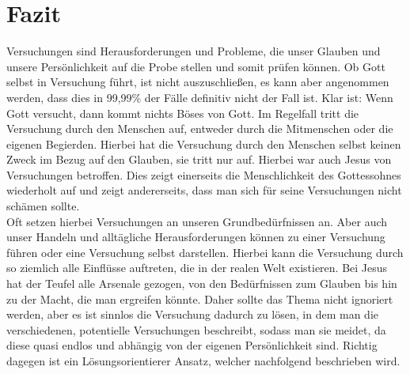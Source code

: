 \section{Fazit}
Versuchungen sind Herausforderungen und Probleme, die unser Glauben und unsere Persönlichkeit auf die Probe stellen und
somit prüfen können. Ob Gott selbst in Versuchung führt, ist nicht auszuschließen, es kann aber angenommen werden, dass
dies in 99,99\% der Fälle definitiv nicht der Fall ist. Klar ist: Wenn Gott versucht, dann kommt nichts Böses von Gott.
Im Regelfall tritt die Versuchung durch den Menschen auf, entweder durch die Mitmenschen oder die eigenen Begierden.
Hierbei hat die Versuchung durch den Menschen selbst keinen Zweck im Bezug auf den Glauben, sie tritt nur auf. Hierbei
war auch Jesus von Versuchungen betroffen. Dies zeigt einerseits die Menschlichkeit des Gottessohnes wiederholt auf und
zeigt andererseits, dass man sich für seine Versuchungen nicht schämen sollte. \\

Oft setzen hierbei Versuchungen an unseren Grundbedürfnissen an. Aber auch unser Handeln und alltägliche
Herausforderungen können zu einer Versuchung führen oder eine Versuchung selbst darstellen. Hierbei kann die Versuchung
durch so ziemlich alle Einflüsse auftreten, die in der realen Welt existieren. Bei Jesus hat der Teufel alle Arsenale
gezogen, von den Bedürfnissen zum Glauben bis hin zu der Macht, die man ergreifen könnte. Daher sollte das Thema nicht
ignoriert werden, aber es ist sinnlos die Versuchung dadurch zu lösen, in dem man die verschiedenen, potentielle
Versuchungen beschreibt, sodass man sie meidet, da diese quasi endlos und abhängig von der eigenen Persönlichkeit sind.
Richtig dagegen ist ein Lösungsorientierer Ansatz, welcher nachfolgend beschrieben wird. \\

